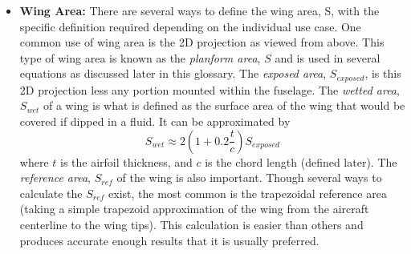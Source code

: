 \documentclass{report}
\begin{document}
\begin{itemize}
    \item[] \textbf{Wing Area:} There are several ways to define the wing area, S, with the specific definition 
    required depending on the individual use case. One common use of wing area is the 2D projection as viewed from above. 
    This type of wing area is known as the \textit{planform area}, $S$ and is used in several equations as 
    discussed later in this glossary. The \textit{exposed area}, $S_{exposed}$, is this 2D projection less any portion
    mounted within the fuselage.
    The \textit{wetted area}, $S_{wet}$ of a wing is what is defined as the surface area of the wing that would be covered if
    dipped in a fluid. It can be approximated by
    \begin{equation}
    S_{wet} \approx 2\left(1+0.2 \frac{t}{c}\right)S_{exposed}
    \end{equation}
    where $t$ is the airfoil thickness, and $c$ is the chord length (defined later).
    The \textit{reference area}, $S_{ref}$ of the wing is also important. 
    Though several ways to calculate the $S_{ref}$ exist, the most common is the trapezoidal reference
    area (taking a simple trapezoid approximation of the wing from the aircraft centerline to the wing tips). 
    This calculation is easier than others and produces accurate enough results that it is usually preferred.


\end{itemize}
\end{document}
